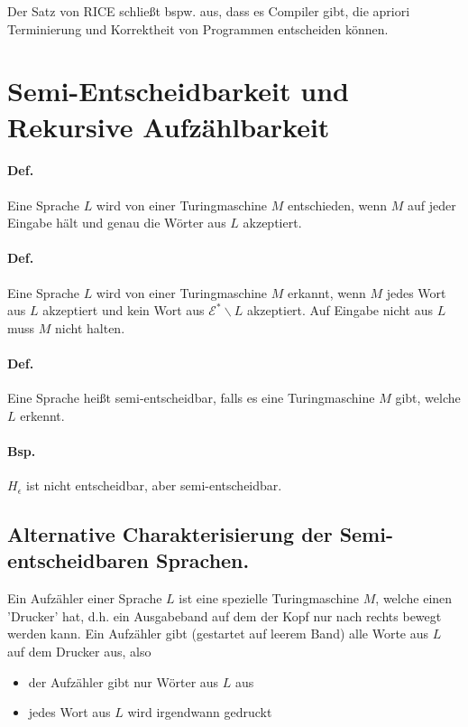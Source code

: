 \par\medskip Der Satz von RICE schließt bspw. aus, dass es Compiler gibt, die apriori Terminierung und Korrektheit von Programmen entscheiden können.


\section{Semi-Entscheidbarkeit und Rekursive Aufzählbarkeit}

\paragraph*{Def.} Eine Sprache $L$ wird von einer Turingmaschine $M$ entschieden, wenn $M$ auf jeder Eingabe hält und genau die Wörter aus $L$ akzeptiert.


\paragraph*{Def.} Eine Sprache $L$ wird von einer Turingmaschine $M$ erkannt, wenn $M$ jedes Wort aus $L$ akzeptiert und kein Wort aus $\mathcal{E}^*\backslash L$ akzeptiert. Auf Eingabe nicht aus $L$ muss $M$ nicht halten.

\paragraph*{Def.} Eine Sprache heißt semi-entscheidbar, falls es eine Turingmaschine $M$ gibt, welche $L$ erkennt.

\paragraph*{Bsp.} $H_\epsilon$ ist nicht entscheidbar, aber semi-entscheidbar.

\subsection{Alternative Charakterisierung der Semi-entscheidbaren Sprachen.}

Ein Aufzähler einer Sprache $L$ ist eine spezielle Turingmaschine $M$, welche einen 'Drucker' hat, d.h. ein Ausgabeband auf dem der Kopf nur nach rechts bewegt werden kann. Ein Aufzähler gibt (gestartet auf leerem Band) alle Worte aus $L$ auf dem Drucker aus, also
\begin{itemize}
	\item der Aufzähler gibt nur Wörter aus $L$ aus
	\item jedes Wort aus $L$ wird irgendwann gedruckt
\end{itemize}


